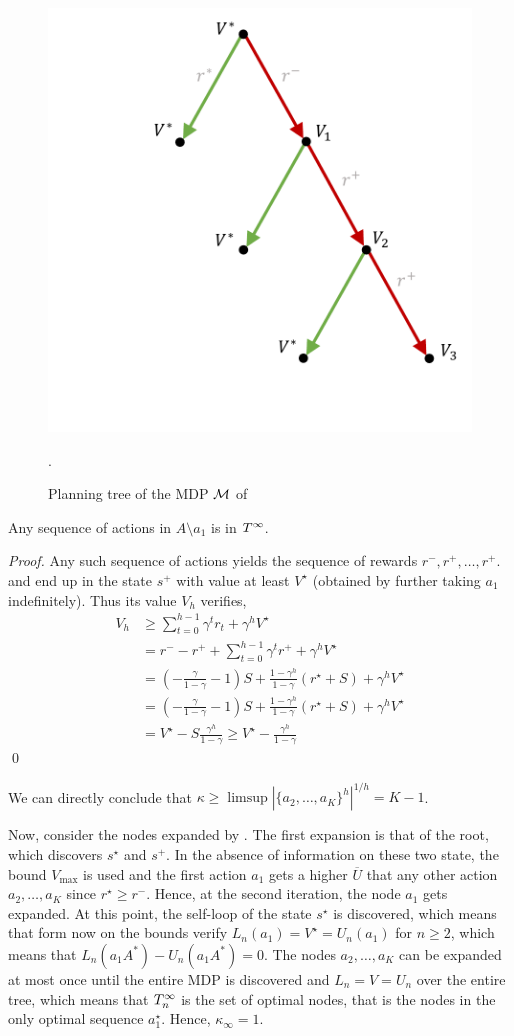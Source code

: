 \documentclass[runningheads]{llncs}
\begin{document}
\begin{figure}
    \centering
    \includegraphics[trim={3.5cm 2cm 0.5cm 0.5cm}, clip, width=0.5\linewidth]{img/mdp_tree.pdf}
    \caption{Planning tree of the MDP $\mathcal{M}$ of }.
    \label{fig:mdp-tree}
\end{figure}
\begin{lemma}
 Any sequence of actions in $A\setminus{a_1}$ is in $T^\infty$.
\end{lemma}
\begin{proof}
Any such sequence of actions yields the sequence of rewards $r^-, r^+, \dots,r^+$. and end up in the state $s^+$ with value at least $V^\star$ (obtained by further taking $a_1$ indefinitely). Thus its value $V_h$ verifies, 
\begin{align*}
    V_h &\geq \sum_{t=0}^{h-1} \gamma^t r_t + \gamma^h V^\star\\
    &= r^- - r^+ + \sum_{t=0}^{h-1} \gamma^t r^+ + \gamma^h V^\star \\
    &= (-\frac{\gamma}{1-\gamma} - 1)S + \frac{1-\gamma^h}{1-\gamma} (r^\star + S) + \gamma^h V^\star\\
    &= (-\frac{\gamma}{1-\gamma} - 1)S + \frac{1-\gamma^h}{1-\gamma} (r^\star + S) + \gamma^h V^\star\\
    &= V^\star - S\frac{\gamma^h}{1-\gamma} \geq V^\star - \frac{\gamma^h}{1-\gamma}
\end{align*}
\qed\end{proof}

We can directly conclude that $\kappa \geq \limsup{|\{a_2,\dots,a_K\}^h|^{1/h}} = K-1$.

Now, consider the nodes expanded by . The first expansion is that of the root, which discovers $s^\star$ and $s^+$. In the absence of information on these two state, the bound $V_{\max}$ is used and the first action $a_1$ gets a higher $\overline{U}$ that any other action $a_2,\dots,a_K$ since $r^\star \geq r^-$. Hence, at the second iteration, the node $a_1$ gets expanded. At this point, the self-loop of the state $s^\star$ is discovered, which means that form now on the bounds verify $L_n(a_1) = V^\star = U_n(a_1)$ for $n\geq2$, which means that $L_n(a_1A^*)-U_n(a_1A^*) = 0$. The nodes $a_2,\dots,a_K$ can be expanded at most once until the entire MDP is discovered and $L_n=V=U_n$ over the entire tree, which means that $T_n^\infty$ is the set of optimal nodes, that is the nodes in the only optimal sequence $a_1^\star$. Hence, $\kappa_\infty = 1.$ 
\end{document}
